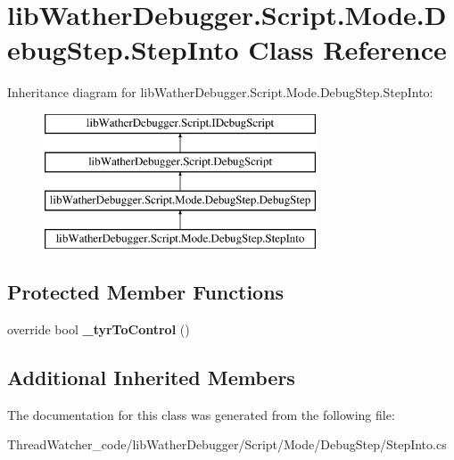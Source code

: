 \hypertarget{classlib_wather_debugger_1_1_script_1_1_mode_1_1_debug_step_1_1_step_into}{\section{lib\+Wather\+Debugger.\+Script.\+Mode.\+Debug\+Step.\+Step\+Into Class Reference}
\label{classlib_wather_debugger_1_1_script_1_1_mode_1_1_debug_step_1_1_step_into}
}
Inheritance diagram for lib\+Wather\+Debugger.\+Script.\+Mode.\+Debug\+Step.\+Step\+Into\+:\begin{figure}[H]
\begin{center}
\leavevmode
\includegraphics[height=4.000000cm]{classlib_wather_debugger_1_1_script_1_1_mode_1_1_debug_step_1_1_step_into}
\end{center}
\end{figure}
\subsection*{Protected Member Functions}
\begin{DoxyCompactItemize}
\item 
\hypertarget{classlib_wather_debugger_1_1_script_1_1_mode_1_1_debug_step_1_1_step_into_a04b3d2fddb33f715f771f493a9f5ab6e}{override bool {\bfseries \+\_\+tyr\+To\+Control} ()}\label{classlib_wather_debugger_1_1_script_1_1_mode_1_1_debug_step_1_1_step_into_a04b3d2fddb33f715f771f493a9f5ab6e}

\end{DoxyCompactItemize}
\subsection*{Additional Inherited Members}


The documentation for this class was generated from the following file\+:\begin{DoxyCompactItemize}
\item 
Thread\+Watcher\+\_\+code/lib\+Wather\+Debugger/\+Script/\+Mode/\+Debug\+Step/Step\+Into.\+cs\end{DoxyCompactItemize}
